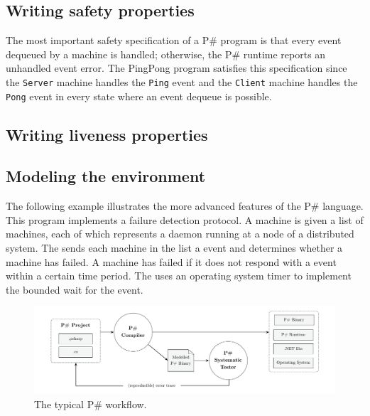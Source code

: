 \documentclass{llncs}
\newcommand{\ps}{P\#\xspace}
\begin{document}
\subsection{Writing safety properties}
\label{sec:safety}

The most important safety specification of a \ps program is that every event dequeued by a machine is handled; otherwise, the \ps runtime reports an unhandled event error. The PingPong program satisfies this specification since the \texttt{Server} machine handles the \texttt{Ping} event and the \texttt{Client} machine handles the \texttt{Pong} event in every state where an event dequeue is possible.

\subsection{Writing liveness properties}
\label{sec:liveness}

\subsection{Modeling the environment}
\label{sec:modeling}

The following example illustrates the more advanced features of the \ps language. This program implements a failure detection protocol. A  machine is given a list of machines, each of which represents a daemon running at a node of a distributed system. The  sends each machine in the list a  event and determines whether a machine has failed. A machine has failed if it does not respond with a  event within a certain time period. The  uses an operating system timer to implement the bounded wait for the  event.


 \begin{figure}[t]
 \centering
 \includegraphics[width=0.95\linewidth]{figures/workflow.pdf}
 \caption{The typical \ps workflow.}
 \label{fig:workflow}
 \end{figure}




\end{document}
